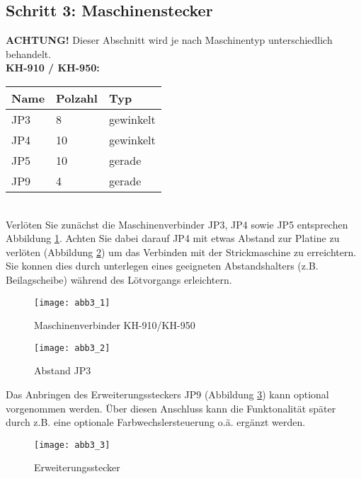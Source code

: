 \documentclass[fleqn,10pt]{SelfArx} %
\begin{document}
\FloatBarrier

 \subsection*{Schritt 3: Maschinenstecker}

\textbf{ACHTUNG!} Dieser Abschnitt wird je nach Maschinentyp unterschiedlich behandelt.\\

\textbf{KH-910 / KH-950:} \\

\begin{tabular}{lll}
\hline
\textbf{Name} & \textbf{Polzahl}  & \textbf{Typ} \\ \hline
JP3           & 8                 & gewinkelt    \\ \hline
JP4           & 10                & gewinkelt    \\ \hline
JP5           & 10                & gerade       \\ \hline
JP9           & 4                 & gerade       \\ \hline
\end{tabular}\\

Verlöten Sie zunächst die Maschinenverbinder JP3, JP4 sowie JP5 entsprechen Abbildung \ref{fig:abb3_1}. Achten Sie dabei darauf JP4 mit etwas Abstand zur Platine zu verlöten (Abbildung \ref{fig:abb3_2}) um das Verbinden mit der Strickmaschine zu erreichtern. Sie konnen dies durch unterlegen eines geeigneten Abstandshalters (z.B. Beilagscheibe) während des Lötvorgangs erleichtern.

\begin{figure}[tbhp]\centering
\texttt{[image: abb3\_1]}
\caption{Maschinenverbinder KH-910/KH-950}
\label{fig:abb3_1}
\end{figure}

\begin{figure}[tbhp]\centering
\texttt{[image: abb3\_2]}
\caption{Abstand JP3}
\label{fig:abb3_2}
\end{figure}

Das Anbringen des Erweiterungssteckers JP9 (Abbildung \ref{fig:abb3_3}) kann optional vorgenommen werden. Über diesen Anschluss kann die Funktonalität später durch z.B. eine optionale Farbwechslersteuerung o.ä. ergänzt werden. \par

\begin{figure}[tbhp]\centering
\texttt{[image: abb3\_3]}
\caption{Erweiterungsstecker}
\label{fig:abb3_3}
\end{figure}
\end{document}
